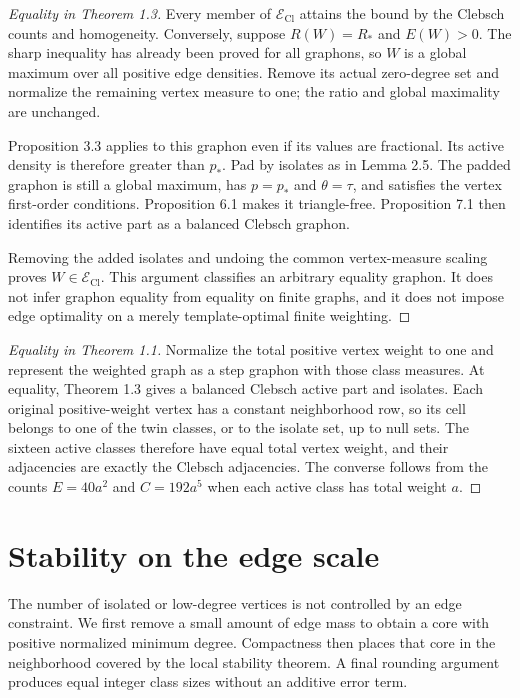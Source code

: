 \begin{proof}[Equality in Theorem 1.3]
Every member of $\mathcal E_{\mathrm{Cl}}$ attains the bound by the Clebsch
counts and homogeneity. Conversely, suppose $R(W)=R_\ast$ and $E(W)>0$.
The sharp inequality has already been proved for all graphons, so $W$ is
a global maximum over all positive edge densities. Remove its actual
zero-degree set and normalize the remaining vertex measure to one; the
ratio and global maximality are unchanged.

Proposition 3.3 applies to this graphon even if its values are fractional.
Its active density is therefore greater than $p_\ast$. Pad by isolates as
in Lemma 2.5. The padded graphon is still a global maximum, has
$p=p_\ast$ and $\theta=\tau$, and satisfies the vertex first-order
conditions. Proposition 6.1 makes it triangle-free. Proposition 7.1 then
identifies its active part as a balanced Clebsch graphon.

Removing the added isolates and undoing the common vertex-measure scaling
proves $W\in\mathcal E_{\mathrm{Cl}}$. This argument classifies an arbitrary
equality graphon. It does not infer graphon equality from equality on finite
graphs, and it does not impose edge optimality on a merely template-optimal
finite weighting.
\end{proof}

\begin{proof}[Equality in Theorem 1.1]
Normalize the total positive vertex weight to one and represent the weighted
graph as a step graphon with those class measures. At equality, Theorem 1.3
gives a balanced Clebsch active part and isolates. Each original
positive-weight vertex has a constant neighborhood row, so its cell belongs
to one of the twin classes, or to the isolate set, up to null sets. The
sixteen active classes therefore have equal total vertex weight, and their
adjacencies are exactly the Clebsch adjacencies. The converse follows from
the counts $E=40a^2$ and $C=192a^5$ when each active class has total weight
$a$.
\end{proof}

\section{Stability on the edge scale}
\label{sec:stability}

The number of isolated or low-degree vertices is not controlled by an edge
constraint. We first remove a small amount of edge mass to obtain a core
with positive normalized minimum degree. Compactness then places that core
in the neighborhood covered by the local stability theorem. A final
rounding argument produces equal integer class sizes without an additive
error term.

